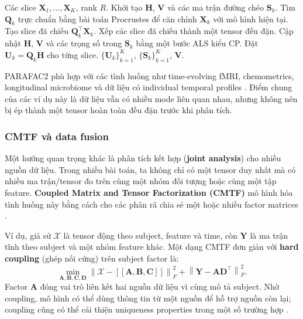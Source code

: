 \begin{algorithm}[H]
\caption{PARAFAC2-ALS ở mức khái niệm}
\label{alg:dm-parafac2-als}
\begin{algorithmic}[1]
    \Require Các slice $\mathbf{X}_1,\ldots,\mathbf{X}_K$, rank $R$.
    \State Khởi tạo $\mathbf{H}$, $\mathbf{V}$ và các ma trận đường chéo $\mathbf{S}_k$.
    \Repeat
            \State Tìm $\mathbf{Q}_k$ trực chuẩn bằng bài toán Procrustes để căn chỉnh $\mathbf{X}_k$ với mô hình hiện tại.
            \State Tạo slice đã chiếu $\mathbf{Q}_k^\top\mathbf{X}_k$.
        \EndFor
        \State Xếp các slice đã chiếu thành một tensor đều đặn.
        \State Cập nhật $\mathbf{H}$, $\mathbf{V}$ và các trọng số trong $\mathbf{S}_k$ bằng một bước ALS kiểu CP.
        \State Đặt $\mathbf{U}_k=\mathbf{Q}_k\mathbf{H}$ cho từng slice.
    \State \Return $\{\mathbf{U}_k\}_{k=1}^K$, $\{\mathbf{S}_k\}_{k=1}^K$, $\mathbf{V}$.
\end{algorithmic}
\end{algorithm}

PARAFAC2 phù hợp với các tình huống như time-evolving fMRI, chemometrics, longitudinal microbiome và dữ liệu có individual temporal profiles \cite{chrysos2025foundationsTutorial}. Điểm chung của các ví dụ này là dữ liệu vẫn có nhiều mode liên quan nhau, nhưng không nên bị ép thành một tensor hoàn toàn đều đặn trước khi phân tích.

\subsubsection{CMTF và data fusion}
\label{sec:dm-parafac2-cmtf}

Một hướng quan trọng khác là phân tích kết hợp (\textbf{joint analysis}) cho nhiều nguồn dữ liệu. Trong nhiều bài toán, ta không chỉ có một tensor duy nhất mà có nhiều ma trận/tensor đo trên cùng một nhóm đối tượng hoặc cùng một tập feature. \textbf{Coupled Matrix and Tensor Factorization (CMTF)} mô hình hóa tình huống này bằng cách cho các phân rã chia sẻ một hoặc nhiều factor matrices \cite{chrysos2025foundationsTutorial}.

Ví dụ, giả sử $\mathcal{X}$ là tensor động theo subject, feature và time, còn $\mathbf{Y}$ là ma trận tĩnh theo subject và một nhóm feature khác. Một dạng CMTF đơn giản với \textbf{hard coupling} (ghép nối cứng) trên subject factor là:
\begin{equation}
    \min_{\mathbf{A},\mathbf{B},\mathbf{C},\mathbf{D}}
    \left\|
    \mathcal{X}
    -
    [\![\mathbf{A},\mathbf{B},\mathbf{C}]\!]
    \right\|_F^2
    +
    \left\|
    \mathbf{Y}
    -
    \mathbf{A}\mathbf{D}^{\top}
    \right\|_F^2.
    \label{eq:dm-cmtf}
\end{equation}
Factor $\mathbf{A}$ đóng vai trò liên kết hai nguồn dữ liệu vì cùng mô tả subject. Nhờ coupling, mô hình có thể dùng thông tin từ một nguồn để hỗ trợ nguồn còn lại; coupling cũng có thể cải thiện uniqueness properties trong một số trường hợp \cite{chrysos2025foundationsTutorial}.

